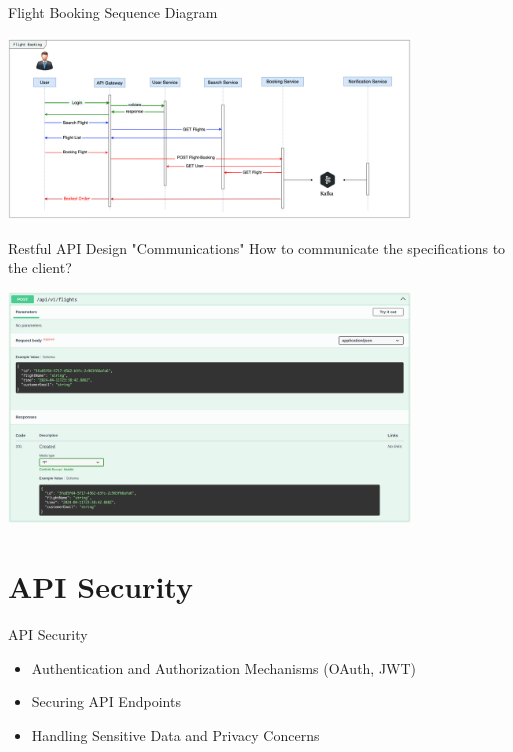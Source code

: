 \documentclass{beamer}
\begin{document}
\begin{frame}[t]{Flight Booking Sequence Diagram}
		\begin{center}
   			\includegraphics[width=0.8\textwidth, height=0.6\textheight]{img/flight-booking-sequence.png}
		\end{center}
\end{frame}

\begin{frame}[t]{Restful API Design "Communications"}
		\scriptsize	
		How to communicate the specifications to the client?

		\begin{center}
   			\includegraphics[width=0.8\textwidth, height=0.6\textheight]{img/swagger-doc.png}
		\end{center}		
	
\end{frame}

\section{API Security}
\begin{frame}{API Security}
  \begin{itemize}
    \item Authentication and Authorization Mechanisms (OAuth, JWT)
    \item Securing API Endpoints
    \item Handling Sensitive Data and Privacy Concerns
  \end{itemize}
\end{frame}
\end{document}
